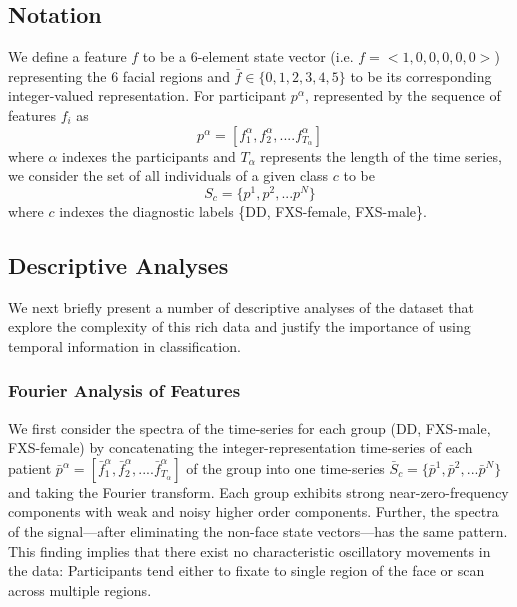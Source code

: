 \documentclass[10pt,twocolumn,letterpaper]{article}
\begin{document}
\subsection{Notation} 
\label{sec:notation}
We define a feature $f$ to be a 6-element state vector (i.e. $f=<1,0,0,0,0,0>$) representing the 6 facial regions and $\bar{f} \in \{0,1,2,3,4,5\}$ to be its corresponding integer-valued representation. For participant $p^\alpha$, represented by the sequence of features $f_i$ as
\begin{equation}
p^\alpha=[f_1^\alpha, f_2^\alpha,....f_{T_\alpha}^\alpha]
\end{equation}
where $\alpha$ indexes the participants and $T_\alpha$ represents the length of the time series, we consider the set of all individuals of a given class $c$ to be
\begin{equation}
S_c=\{p^1, p^2,...p^N \}
\end{equation}
 where $c$ indexes the diagnostic labels \{DD, FXS-female, FXS-male\}.

\subsection{Descriptive Analyses}

We next briefly present a number of descriptive analyses of the dataset that explore the complexity of this rich data and justify the importance of using temporal information in classification.

\subsubsection{Fourier Analysis of Features}

We first consider the spectra of the time-series for each group (DD, FXS-male, FXS-female) by concatenating the integer-representation time-series of each patient $\bar{p}^\alpha=[\bar{f}_1^\alpha, \bar{f}_2^\alpha,....\bar{f}_{T_\alpha}^\alpha]$ of the group into one time-series $\bar{S}_c=\{\bar{p}^1, \bar{p}^2,...\bar{p}^N \}$ and taking the Fourier transform. Each group exhibits strong near-zero-frequency components with weak and noisy higher order components. Further, the spectra of the signal---after eliminating the non-face state vectors---has the same pattern. This finding implies that there exist no characteristic oscillatory movements in the data: Participants tend either to fixate to single region of the face or scan across multiple regions. 
\end{document}
